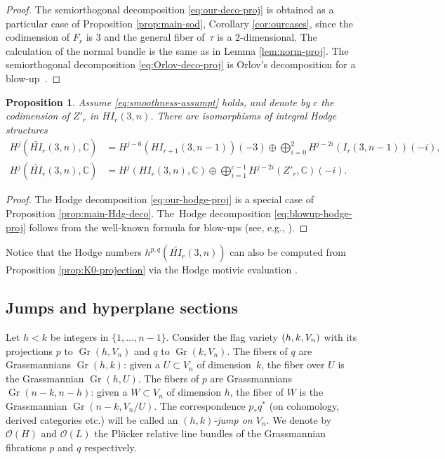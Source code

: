 \documentclass[JEP,XML,SOM,Unicode,NoEqCountersInSection]{cedram}
\newcommand{\NoChangel}[1]{%
\expandafter\let\csname old\string#1\endcsname=#1
\let#1=\relax
\newcommand{#1}{\mathcode`l="716C\csname old\string#1\endcsname\mathcode`l="7160 }%
}
\let\mathcal\mathscr
\theoremstyle{plain}
\newtheorem{prop}[theorem]{Proposition}
\theoremstyle{definition}
\newcommand{\linedef}[1]{\emph{#1}}
\DeclareMathOperator{\Gr}{Gr}
\DeclareMathOperator{\Fl}{Fl}\NoChangel{\Fl}
\newcommand{\CC}{\mathbb{C}}
\newcommand{\sheaf}[1]{\mathcal{#1}}
\newcommand{\ko}{\sheaf{O}}\let\OO\ko\let\cO\ko
\begin{document}
\begin{proof}
The semiorthogonal decomposition \eqref{eq:our-deco-proj} is obtained as a particular case of Proposition \ref{prop:main-sod}, Corollary \ref{cor:ourcases}, since the codimension of $F_r$ is $3$ and the general fiber of~$\tau$ is a $2$-dimensional. The calculation of the normal bundle is the same as in Lemma \ref{lem:norm-proj}. The semiorthogonal decomposition \eqref{eq:Orlov-deco-proj} is Orlov's decomposition
for a blow-up~\cite{orlovprojbund}.
\end{proof}

\begin{prop}\label{prop:Hodge-projection}
Assume \eqref{eq:smoothness-assumpt} holds, and denote by $c$ the codimension of $Z'_r$ in $HI_r(3,n)$. There are isomorphisms of integral Hodge structures
\begin{align}\label{eq:our-hodge-proj}
H^j(\widetilde{HI_r}(3,n),\CC) &= H^{j-6}(HI_{r+1}(3,n-1))(-3) \oplus \bigoplus_{i=0}^2 H^{j-2i}(I_r(3,n-1))(-i),
\\
\label{eq:blowup-hodge-proj}
H^j(\widetilde{HI_r}(3,n),\CC) &= H^j(HI_r(3,n),\CC) \oplus \bigoplus_{i=1}^{c-1} H^{j-2i}(Z'_r,\CC)(-i).
\end{align}
\end{prop}

\begin{proof}
The Hodge decomposition \eqref{eq:our-hodge-proj} is a special case of Proposition \ref{prop:main-Hdg-deco}. The~Hodge decomposition \eqref{eq:blowup-hodge-proj} follows
from the well-known formula for blow-ups (see, e.g., \hbox{\cite[7.7.3]{voisin-book}}).
\end{proof}

Notice that the Hodge numbers $h^{p,q}(\widetilde{HI_r}(3,n))$ can also be computed from
Proposition \ref{prop:K0-projection} via the Hodge motivic evaluation \cite[\S 3.2]{craw}.

\subsection{Jumps and hyperplane sections}

Let $h<k$ be integers in $\{1,\ldots,n-1\}$.
Consider the flag variety $\Fl(h,k,V_n)$ with its projections $p$ to $\Gr(h,V_n)$ and $q$
to $\Gr(k,V_n)$. The fibers of $q$ are Grassmannians $\Gr(h,k)$: given a $U \subset V_n$ of dimension~$k$, the fiber over $U$ is the Grassmannian $\Gr(h,U)$. The fibers of
$p$ are Grassmannians $\Gr(n-k,n-h)$: given a $W \subset V_n$ of dimension $h$, the fiber of $W$ is the Grassmannian $\Gr(n-k,V_n/U)$. The correspondence $p_*q^*$ (on cohomology, derived categories etc.)
will be called an \linedef{$(h,k)$-jump on $V_n$}. We denote by $\ko(H)$ and $\ko(L)$ the Plücker
relative line bundles of the Grassmannian fibrations $p$ and $q$ respectively.
\end{document}
